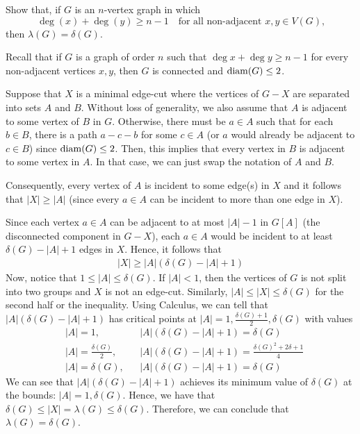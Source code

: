 \question Show that, if $G$ is an $n$-vertex graph in which 
\[
  \deg(x)+\deg(y) \geq n-1 \quad
  \text{for all non-adjacent $x, y \in V(G)$,} 
\]
then $\lambda(G)=\delta(G)$.

\begin{solution}
  Recall that if \(G\) is a graph of order \(n\) such
  that \(\deg x + \deg y \geq n-1\) for every non-adjacent vertices \(x, y\),
  then \(G\) is connected and \(\operatorname{diam}(G) \leq 2\).

  Suppose that \(X\) is a minimal edge-cut where the vertices of \(G - X\) are
  separated into sets \(A\) and \(B\).
  Without loss of generality, we also assume that \(A\) is adjacent
  to some vertex of \(B\) in \(G\).
  Otherwise, there must be \(a \in A\) such 
  that for each \(b \in B\), there is a path \(a - c - b\) for some \(c \in 
  A\) (or \(a\) would already be adjacent to \(c \in B\)) since \(\operatorname{diam}(G) \leq
  2\). Then, this implies that every vertex in \(B\) is adjacent to some vertex 
  in \(A\). In that case, we can just swap the notation of \(A\) and \(B\).

  Consequently, every vertex of \(A\) is incident to some edge(s) in \(X\) 
  and it follows that \(|X| \geq |A|\) (since every \(a \in A\) can be 
  incident to more than one edge in \(X\)).

  Since each vertex \(a \in A\) can be adjacent to at most \(|A| - 1\) in
  \(G[A]\) (the disconnected component in \(G-X\)), each \(a \in A\)
  would be incident to at least \( \delta(G) - |A| + 1 \)
  edges in \(X\). Hence, it follows that 
  \[
    \begin{aligned}
      |X| \geq |A|(\delta(G) - |A| + 1)
    \end{aligned}
  \]
  Now, notice that \(1 \leq |A| \leq \delta(G)\). If \(|A| < 1\), then the
  vertices of \(G\) is not split into two groups and \(X\) is not an edge-cut.
  Similarly, \(|A| \leq |X| \leq \delta(G)\) for the second half or the
  inequality.
  Using Calculus, we can tell that \(|A|(\delta(G) - |A| + 1)\) has critical
  points at \(|A| = 1, \frac{\delta(G)+1}{2}, \delta(G)\) with values
  \[
    \begin{aligned}
      &|A| = 1,
      && |A|(\delta(G) - |A| + 1) = \delta(G) \\
      &|A| = \frac{\delta(G)}{2},
      && |A|(\delta(G) - |A| + 1) = \frac{\delta(G)^2 + 2\delta + 1}{4} \\
      &|A| = \delta(G),
      && |A|(\delta(G) - |A| + 1) = \delta(G)
    \end{aligned}
  \]
  We can see that \(|A|(\delta(G) - |A| + 1)\) achieves its minimum
  value of \(\delta(G)\) at the bounds: \(|A| = 1, \delta(G)\). Hence, we have
  that \(\delta(G) \leq |X| = \lambda(G) \leq \delta(G)\). Therefore, we can
  conclude that \(\lambda(G) = \delta(G)\).
\end{solution}

